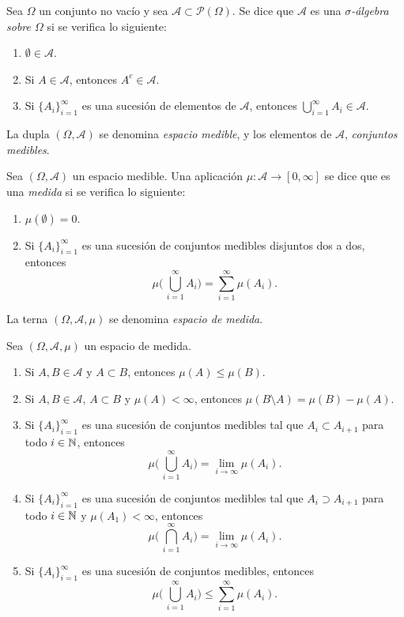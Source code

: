 \documentclass[a4paper, 11pt, extrafontsizes]{memoir}
\begin{document}
\begin{definition}
    Sea $\Omega$ un conjunto no vacío y sea $\mathcal{A} \subset \mathcal{P}(\Omega)$. Se dice que $\mathcal{A}$ es una \emph{$\sigma$-álgebra sobre $\Omega$} si se verifica lo siguiente:
    \begin{enumerate}
        \item $\emptyset \in \mathcal{A}$.
        \item Si $A \in \mathcal{A}$, entonces $A^c \in \mathcal{A}$.
        \item Si $\{A_i\}_{i=1}^\infty$ es una sucesión de elementos de $\mathcal{A}$, entonces $\bigcup_{i=1}^\infty A_i \in \mathcal{A}$.
    \end{enumerate}
    La dupla $(\Omega, \mathcal{A})$ se denomina \emph{espacio medible}, y los elementos de $\mathcal{A}$, \emph{conjuntos medibles}.
\end{definition}

\begin{definition}
    Sea $(\Omega, \mathcal{A})$ un espacio medible. Una aplicación $\mu \colon \mathcal{A} \to [0,\infty]$ se dice que es una \emph{medida} si se verifica lo siguiente:
    \begin{enumerate}
        \item $\mu(\emptyset) = 0 $.
        \item Si $\{A_i\}_{i=1}^\infty$ es una sucesión de conjuntos medibles disjuntos dos a dos, entonces
        \[\mu\biggl( \, \bigcup_{i=1}^\infty A_i\biggr) = \sum_{i=1}^\infty \mu(A_i).\]
    \end{enumerate}
    La terna $(\Omega, \mathcal{A}, \mu)$ se denomina \emph{espacio de medida}.
\end{definition}

\begin{proposition}
    Sea $(\Omega, \mathcal{A},\mu)$ un espacio de medida.
    \begin{enumerate}
        \item Si $A,B \in \mathcal{A}$ y $A \subset B$, entonces $\mu(A) \leq \mu(B)$.
        \item Si $A,B \in \mathcal{A}$, $A \subset B$ y $\mu(A)< \infty$, entonces $\mu(B \setminus A) = \mu(B)-\mu(A)$.
        \item Si $\{A_i\}_{i=1}^\infty$ es una sucesión de conjuntos medibles tal que $A_i \subset A_{i+1}$ para todo $i \in \mathbb N$, entonces
        \[\mu\biggl(\, \bigcup_{i=1}^\infty A_i \biggr) = \lim_{i \to \infty} \mu(A_i).\]
        \item Si $\{A_i\}_{i=1}^\infty$ es una sucesión de conjuntos medibles tal que $A_i \supset A_{i+1}$ para todo $i \in \mathbb N$ y $\mu(A_1) < \infty$, entonces
        \[\mu\biggl(\, \bigcap_{i=1}^\infty A_i \biggr) = \lim_{i \to \infty} \mu(A_i).\]
        \item Si $\{A_i\}_{i=1}^\infty$ es una sucesión de conjuntos medibles, entonces
        \[\mu\biggl(\, \bigcup_{i=1}^\infty A_i \biggr) \leq \sum_{i=1}^\infty \mu(A_i).\]
    \end{enumerate}
\end{proposition}
\end{document}
